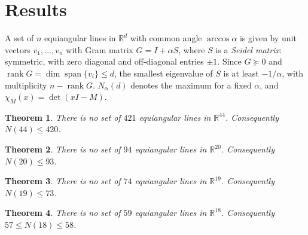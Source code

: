 \documentclass[11pt]{article}
\newtheorem{theorem}{Theorem}
\theoremstyle{definition}
\newcommand{\R}{\mathbb{R}}
\begin{document}
\begin{abstract}
For $d=18$, $59$ lines force $\chi_S=(x+5)^{41}(x-11)\,\psi(x-11)$ with $\psi$ of degree $17$. Two
programs enumerate the $\psi$ that satisfy the $2$-adic conditions of Greaves and Yatsyna, on
prefixes of the coefficient vector, and find the same $1{,}214$ candidates. Interlacing with these
conditions, the pair analysis at odd order, and a third level (triangle types of three vertices,
linear systems for each edge type, and a relaxed vertex-star test for large cliques) exclude all
but one. The last one, $(x+5)^{41}(x-11)^{14}(x-15)^2(x^2-21x+94)$, forces a rigid structure on
the $40$ vertices of one deck member, and a finite computation excludes it. Both programs, written
independently, exclude every candidate. As a by-product we record a parity sharpening of the
relative bound. It comes from known tools.
\end{abstract}

\section{Results}

A set of $n$ equiangular lines in $\R^d$ with common angle $\arccos\alpha$ is given by unit
vectors $v_1,\dots,v_n$ with Gram matrix $G=I+\alpha S$, where $S$ is a \emph{Seidel matrix}:
symmetric, with zero diagonal and off-diagonal entries $\pm1$. Since $G\succeq0$ and
$\operatorname{rank}G=\dim\operatorname{span}\{v_i\}\le d$, the smallest eigenvalue of $S$ is at
least $-1/\alpha$, with multiplicity $n-\operatorname{rank}G$. $N_\alpha(d)$ denotes the maximum
for a fixed $\alpha$, and $\chi_M(x)=\det(xI-M)$.

\begin{theorem}\label{thm:main}
There is no set of $421$ equiangular lines in $\R^{44}$. Consequently $N(44)\le420$.
\end{theorem}

\begin{theorem}\label{thm:d20}
There is no set of $94$ equiangular lines in $\R^{20}$. Consequently $N(20)\le93$.
\end{theorem}

\begin{theorem}\label{thm:d19}
There is no set of $74$ equiangular lines in $\R^{19}$. Consequently $N(19)\le73$.
\end{theorem}

\begin{theorem}\label{thm:d18}
There is no set of $59$ equiangular lines in $\R^{18}$. Consequently $57\le N(18)\le58$.
\end{theorem}
\end{document}
